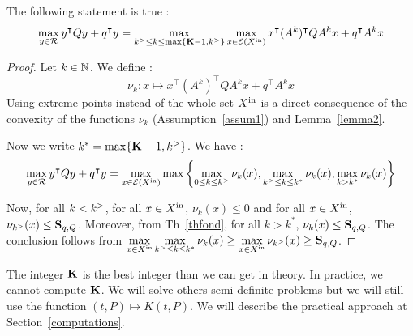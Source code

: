 \documentclass[10pt]{article}
\begin{document}
\begin{corollary}
The following statement is true :
 \[
\max_{y\in\mathcal{R}} y^\intercal Q y+q^\intercal y=\max_{k^{>}\leq k\leq \max\{\mathbf{K}-1,k^{>}\}} \max_{x\in \mathcal{E}(X^\mathrm{in})} x^\intercal (A^k)^\intercal Q A^k x+q^\intercal A^k x
\]
\end{corollary}

\begin{proof}
Let $k\in\mathbb{N}$. We define :
\[
\nu_k:x\mapsto x^\intercal (A^k)^\intercal Q A^k x+q^\intercal A^k x 
\]
Using extreme points instead of the whole set $X^\mathrm{in}$ is a direct consequence of the convexity of the functions $\nu_k$ (Assumption~\ref{assum1}) and Lemma~\ref{lemma2}.

Now we write $k^*=\max\{\mathbf{K}-1,k^{>}\}$. We have :
 \[
\max_{y\in\mathcal{R}} y^\intercal Q y+q^\intercal y
=\max_{x\in \mathcal{E}(X^\mathrm{in})}\max\left\{\max_{0\leq k\leq k^{>}} \nu_k(x), \max_{k^{>} \leq k\leq k^*} \nu_k(x),\max_{k>k^*} \nu_k(x)\right\}
\]

Now, for all $k< k^{>}$, for all $x\in X^\mathrm{in}$, $\nu_k(x)\leq 0$ and for all $x\in X^\mathrm{in}$, $\nu_{k^{>}}(x)\leq \mathbf{S}_{q,Q}$. Moreover, from Th~\ref{thfond}, 
for all $k>k^*$, $\nu_k(x)\leq \mathbf{S}_{q,Q}$. The conclusion follows from $\displaystyle{\max_{x\in X^\mathrm{in}} \max_{k^{>}\leq k\leq k^*} \nu_k(x)\geq \max_{x\in X^\mathrm{in}} \nu_{k^{>}}(x)\geq \mathbf{S}_{q,Q}}$. 
\end{proof}
The integer $\mathbf{K}$ is the best integer than we can get in theory. In practice, we cannot compute $\mathbf{K}$. We will solve others semi-definite problems but we will still use the function $(t,P)\mapsto K(t,P)$. We will describe the practical approach at Section~\ref{computations}.

\end{document}
